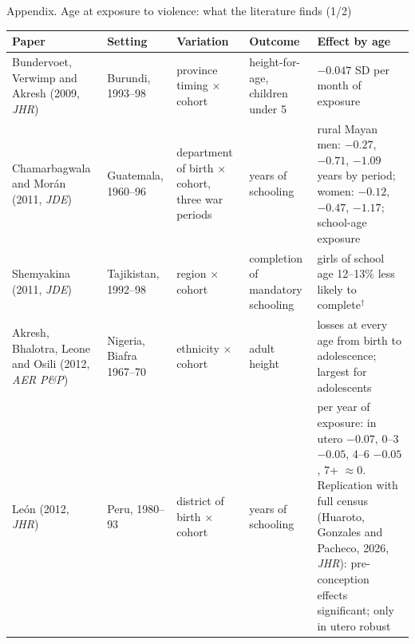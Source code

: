 \documentclass[aspectratio=169,11pt]{beamer}
\begin{document}
\begin{frame}{Appendix. Age at exposure to violence: what the literature finds (1/2)}
\scriptsize
\setlength{\tabcolsep}{4pt}\renewcommand{\arraystretch}{1.1}
\begin{tabular}{@{}p{2.8cm}p{1.9cm}p{2.2cm}p{1.8cm}p{3.7cm}@{}}
\toprule
\textbf{Paper} & \textbf{Setting} & \textbf{Variation} & \textbf{Outcome} & \textbf{Effect by age} \\
\midrule
Bundervoet, Verwimp and Akresh (2009, \emph{JHR}) & Burundi, 1993--98 & province timing $\times$ cohort & height-for-age, children under 5 & $-0.047$ SD per month of exposure \\
Chamarbagwala and Morán (2011, \emph{JDE}) & Guatemala, 1960--96 & department of birth $\times$ cohort, three war periods & years of schooling & rural Mayan men: $-0.27$, $-0.71$, $-1.09$ years by period; women: $-0.12$, $-0.47$, $-1.17$; school-age exposure \\
Shemyakina (2011, \emph{JDE}) & Tajikistan, 1992--98 & region $\times$ cohort & completion of mandatory schooling & girls of school age 12--13\% less likely to complete$^{\dagger}$ \\
Akresh, Bhalotra, Leone and Osili (2012, \emph{AER P\&P}) & Nigeria, Biafra 1967--70 & ethnicity $\times$ cohort & adult height & losses at every age from birth to adolescence; largest for adolescents \\
León (2012, \emph{JHR}) & Peru, 1980--93 & district of birth $\times$ cohort & years of schooling & per year of exposure: in utero $-0.07$, 0--3 $-0.05$, 4--6 $-0.05$, 7+ $\approx 0$. Replication with full census (Huaroto, Gonzales and Pacheco, 2026, \emph{JHR}): pre-conception effects significant; only in utero robust \\
\bottomrule
\end{tabular}
\end{frame}
\end{document}
